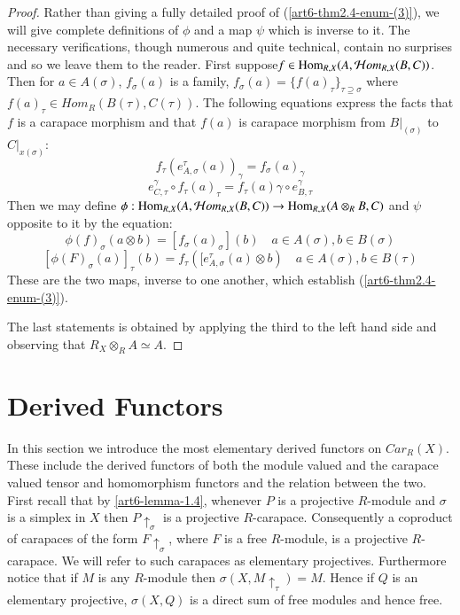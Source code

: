 \begin{proof}
Rather than giving a fully detailed proof of (\ref{art6-thm2.4-enum-(3)}), we will give complete definitions of $\phi$ and a map $\psi$ which is inverse to it. The necessary verifications, though numerous and quite technical, contain no surprises and so we leave them to the reader. First suppose\break $f \in \operatorname{Hom}_{R,X}(A, \mathcal{H} om_{R,X}(B, C))$. Then for
$a \in A(\sigma)$, $f_{\sigma}(a)$ is a family, $f_{\sigma}(a)  =\{f(a)_{\tau}\}_{\tau \supseteq \sigma}$ where
$f(a)_{\tau} \in Hom_{R}(B(\tau), C(\tau))$. The following equations express the facts that $f$ is a carapace morphism and that $f(a)$ is carapace morphism from $B|_(\sigma)$ to $C|_{x(\sigma)}$:
\begin{equation}\label{art6-eq-5}
f_{\tau}(e_{A,\sigma}^{\tau}(a))_{\gamma} = f_{\sigma}(a)_{\gamma}%
\end{equation}
\begin{equation}\label{art6-eq-6}
e_{C, \tau}^{\gamma} \circ f_{\tau}(a)_{\tau} = f_{\tau}(a)\gamma \circ e_{B,\tau}^{\gamma}
\end{equation}
Then we may define $\phi : \operatorname{Hom}_{R,X}(A, \mathcal{H} om_{R,X}(B,C))\rightarrow \operatorname{Hom}_{R,X}(A \otimes_{R}B, C)$ and $\psi$ opposite to it by the equation:
\begin{equation}\label{art6-eq-7}
\phi(f)_{\sigma}(a\otimes b) =[f_{\sigma}(a)_{\sigma}](b) \quad a\in A(\sigma), b\in B(\sigma)
\end{equation}
\begin{equation}\label{art6-eq-8}
[\phi (F)_{\sigma}(a)]_{\tau}(b) = f_{\tau}([e_{A, \sigma}^{\tau}(a)\otimes b) \quad a\in A(\sigma), b \in B(\tau)
\end{equation}
These are the two maps, inverse to one another, which establish (\ref{art6-thm2.4-enum-(3)}).

The last statements is obtained by applying the third to the left hand side and observing that $R_{X}\otimes_{R}A\simeq A$.
\end{proof}

\section{Derived Functors}\label{art6-sec-3}

In this section we introduce the most elementary derived functors on $C ar_{R}(X)$. These include the derived functors of both the module valued and the carapace valued tensor and homomorphism functors and the relation between the two. First recall that by \ref{art6-lemma-1.4}, whenever $P$ is a projective $R$-module and $\sigma$ is a simplex in $X$ then $P\uparrow_{\sigma}$ is a projective $R$-carapace. Consequently a coproduct of carapaces of the form $F \uparrow_{\sigma}$, where $F$ is a free $R$-module, is a projective $R$-carapace. We will refer to such carapaces as elementary projectives. Furthermore notice that if $M$ is any $R$-module then $\sigma(X, M\uparrow_{\tau})=M$. Hence if $Q$ is an elementary projective, $\sigma(X, Q)$ is a direct sum of free modules and hence free.

